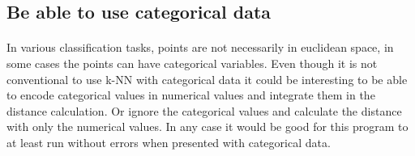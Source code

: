 \documentclass[11 pt]{article}
\begin{document}
\subsection{Be able to use categorical data}
\paragraph{}In various classification tasks, points are not necessarily in euclidean space, in some cases the points can have categorical variables. Even though it is not conventional to use k-NN with categorical data it could be interesting to be able to encode categorical values in numerical values and integrate them in the distance calculation. Or ignore the categorical values and calculate the distance with only the numerical values. In any case it would be good for this program to at least run without errors when presented with categorical data.
\end{document}
